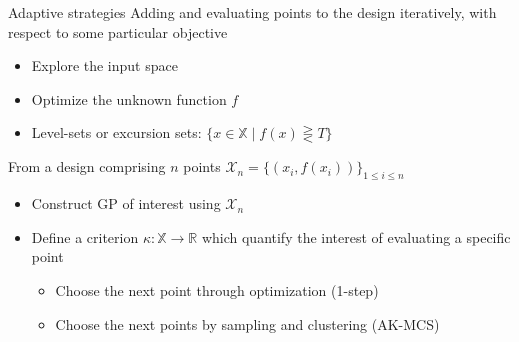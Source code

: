 \documentclass[10pt,aspectratio=169,usepdftitle=false]{beamer}
\newcommand{\Xspace}{\mathbb{X}}
\begin{document}
\begin{frame}{Adaptive strategies}
    Adding and evaluating points to the design iteratively, with
    respect to some particular objective
  \begin{itemize}
  \item Explore the input space
  \item Optimize the unknown function $f$
  \item Level-sets or excursion sets: $\{x \in \Xspace \mid f(x) \gtreqless T\}$
  \end{itemize}
  From a design comprising $n$ points $\mathcal{X}_n = \{(x_i, f(x_i))\}_{1 \leq i \leq n}$
  \begin{itemize}
  \item Construct GP of interest using $\mathcal{X}_n$
  \item Define a criterion $\kappa:\Xspace \rightarrow \mathbb{R}$
    which quantify the interest of evaluating a specific point
    \begin{itemize}
    \item Choose the next point through optimization (1-step)
    \item Choose the next point\alert{s} by sampling and clustering (AK-MCS)
    \end{itemize}
  \end{itemize}
\end{frame}
\end{document}
